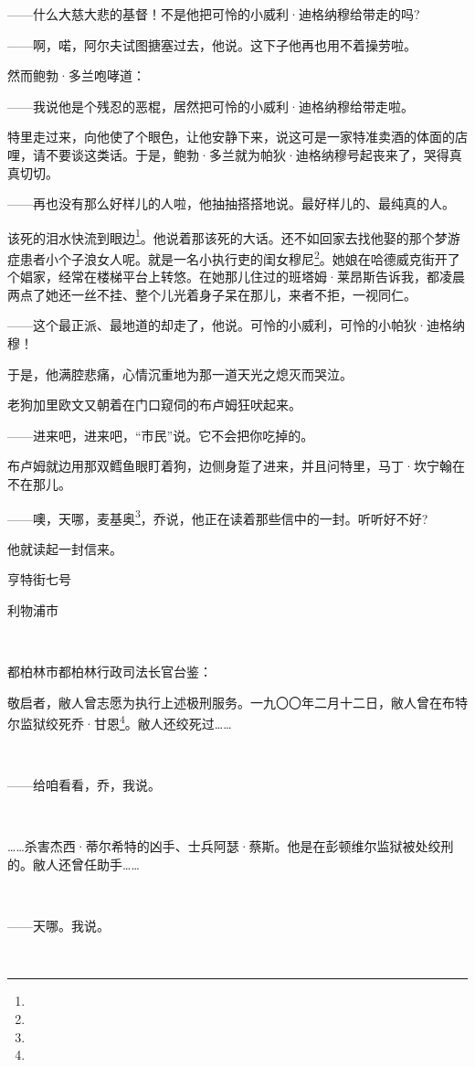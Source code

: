 \par ——什么大慈大悲的基督！不是他把可怜的小威利·迪格纳穆给带走的吗?
\par ——啊，喏，阿尔夫试图搪塞过去，他说。这下子他再也用不着操劳啦。
\par 然而鲍勃·多兰咆哮道：
\par ——我说他是个残忍的恶棍，居然把可怜的小威利·迪格纳穆给带走啦。
\par 特里走过来，向他使了个眼色，让他安静下来，说这可是一家特准卖酒的体面的店哩，请不要谈这类话。于是，鲍勃·多兰就为帕狄·迪格纳穆号起丧来了，哭得真真切切。
\par ——再也没有那么好样儿的人啦，他抽抽搭搭地说。最好样儿的、最纯真的人。
\par 该死的泪水快流到眼边\footnote{}。他说着那该死的大话。还不如回家去找他娶的那个梦游症患者小个子浪女人呢。就是一名小执行吏的闺女穆尼\footnote{}。她娘在哈德威克街开了个娼家，经常在楼梯平台上转悠。在她那儿住过的班塔姆·莱昂斯告诉我，都凌晨两点了她还一丝不挂、整个儿光着身子呆在那儿，来者不拒，一视同仁。
\par ——这个最正派、最地道的却走了，他说。可怜的小威利，可怜的小帕狄·迪格纳穆！
\par 于是，他满腔悲痛，心情沉重地为那一道天光之熄灭而哭泣。
\par 老狗加里欧文又朝着在门口窥伺的布卢姆狂吠起来。
\par ——进来吧，进来吧，“市民”说。它不会把你吃掉的。
\par 布卢姆就边用那双鳕鱼眼盯着狗，边侧身踅了进来，并且问特里，马丁·坎宁翰在不在那儿。
\par ——噢，天哪，麦基奥\footnote{}，乔说，他正在读着那些信中的一封。听听好不好?
\par 他就读起一封信来。
\par 亨特街七号
\par 利物浦市
\par  
\par 都柏林市都柏林行政司法长官台鉴：
\par 敬启者，敝人曾志愿为执行上述极刑服务。一九〇〇年二月十二日，敝人曾在布特尔监狱绞死乔·甘恩\footnote{}。敝人还绞死过……
\par  
\par ——给咱看看，乔，我说。
\par  
\par ……杀害杰西·蒂尔希特的凶手、士兵阿瑟·蔡斯。他是在彭顿维尔监狱被处绞刑的。敝人还曾任助手……
\par  
\par ——天哪。我说。
\par  
